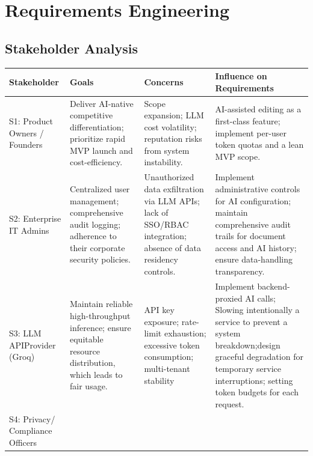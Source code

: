 \documentclass{article}
\begin{document}
\section{Requirements Engineering}
\subsection{Stakeholder Analysis}

\setlength{\tabcolsep}{5pt}
\renewcommand{\arraystretch}{1.2} %

\noindent
\begin{tabularx}{\textwidth}{|>{\hsize=0.5\hsize}X|>{\hsize=1.1\hsize}X|>{\hsize=1.2\hsize}X|>{\hsize=1.2\hsize}X|}
    \hline
    \rowcolor{tableBlue} 
    \textbf{\color{white}Stakeholder} & 
    \textbf{\color{white}Goals} & 
    \textbf{\color{white}Concerns} & 
    \textbf{\color{white}Influence on Requirements} \\
    \hline
    S1: Product \newline Owners / Founders&
    Deliver AI-native competitive differentiation; prioritize rapid MVP launch and cost-efficiency. & 
    Scope expansion; LLM cost volatility; reputation risks from system instability.& 
    AI-assisted editing as a first-class feature; implement per-user token quotas and a lean MVP scope. \\
    \hline
    S2: Enterprise IT Admins & 
    Centralized user management;
    comprehensive audit logging; adherence to their corporate security policies.& 
    Unauthorized data exfiltration via LLM APIs; lack of SSO/RBAC integration; absence of data residency controls. 
    & 
    Implement administrative controls for AI configuration; maintain comprehensive audit trails for document access and AI history; ensure data-handling transparency. \\
    \hline
    S3: LLM API\newline Provider (Groq) & 
    Maintain reliable high-throughput inference; ensure equitable resource distribution, which leads to fair usage. 
    & 
    API key exposure; rate-limit exhaustion; excessive token consumption; multi-tenant stability 
    & 
    Implement backend-proxied AI calls; Slowing intentionally a service to prevent a system breakdown;design graceful degradation for temporary service interruptions; setting token budgets for each request.\\
    \hline
    S4: Privacy/ \newline Compliance \newline Officers & 

\end{tabularx}
\end{document}
